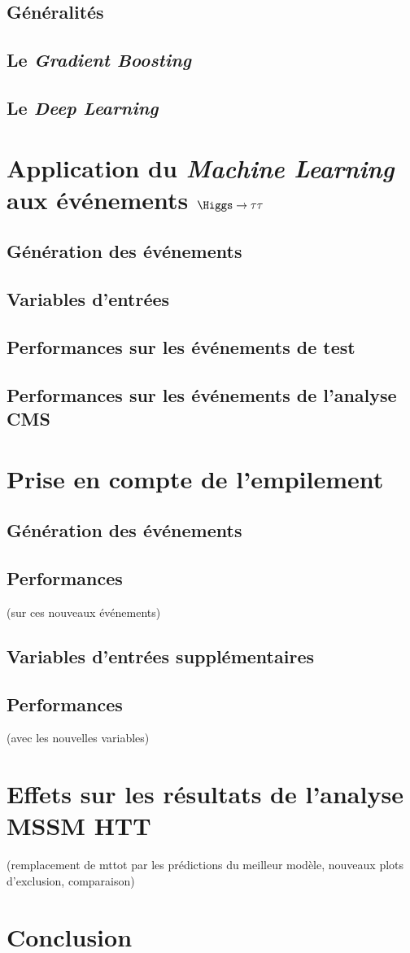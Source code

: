 \subsection{Généralités}
\subsection{Le \emph{Gradient Boosting}}
\subsection{Le \emph{Deep Learning}}

\section{Application du \emph{Machine Learning} aux événements $\Higgs\to\tau\tau$}
\subsection{Génération des événements}
\subsection{Variables d'entrées}
\subsection{Performances sur les événements de test}
\subsection{Performances sur les événements de l'analyse CMS}

\section{Prise en compte de l'empilement}
\subsection{Génération des événements}
\subsection{Performances} (sur ces nouveaux événements)
\subsection{Variables d'entrées supplémentaires}
\subsection{Performances} (avec les nouvelles variables)

\section{Effets sur les résultats de l'analyse MSSM HTT}
(remplacement de mttot par les prédictions du meilleur modèle, nouveaux plots d'exclusion, comparaison)

\section{Conclusion}